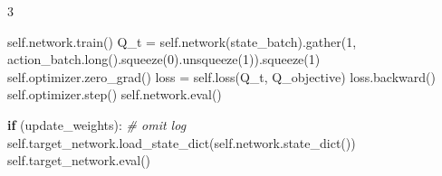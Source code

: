 \documentclass{article}
\newenvironment{Shaded}{\CodeFontSize\setlength{\topsep}{\CodeBlockSkip}\setlength{\partopsep}{0pt}}{}
\newcommand{\BuiltInTok}[1]{\textcolor[rgb]{0.00,0.50,0.00}{#1}}
\newcommand{\CommentTok}[1]{\textcolor[rgb]{0.38,0.63,0.69}{\textit{#1}}}
\newcommand{\ControlFlowTok}[1]{\textcolor[rgb]{0.00,0.44,0.13}{\textbf{#1}}}
\newcommand{\DecValTok}[1]{\textcolor[rgb]{0.25,0.63,0.44}{#1}}
\newcommand{\NormalTok}[1]{#1}
\newcommand{\OperatorTok}[1]{\textcolor[rgb]{0.40,0.40,0.40}{#1}}
\newcommand{\VariableTok}[1]{\textcolor[rgb]{0.10,0.09,0.49}{#1}}
\newcommand{\CodeFontSize}{\fontsize{4.8}{5.6}\selectfont}
\newcommand{\NumColumns}{3}  %
\newlength{\CodeBlockSkip}
\begin{document}
\begin{multicols*}{\NumColumns}
\begin{Shaded}
\begin{Highlighting}[]
  \VariableTok{self}\NormalTok{.network.train()}
\NormalTok{  Q\_t }\OperatorTok{=} \VariableTok{self}\NormalTok{.network(state\_batch).gather(}\DecValTok{1}\NormalTok{, action\_batch.}\BuiltInTok{long}\NormalTok{().squeeze(}\DecValTok{0}\NormalTok{).unsqueeze(}\DecValTok{1}\NormalTok{)).squeeze(}\DecValTok{1}\NormalTok{)}
  \VariableTok{self}\NormalTok{.optimizer.zero\_grad()}
\NormalTok{  loss }\OperatorTok{=} \VariableTok{self}\NormalTok{.loss(Q\_t, Q\_objective)}
\NormalTok{  loss.backward()}
  \VariableTok{self}\NormalTok{.optimizer.step()}
  \VariableTok{self}\NormalTok{.network.}\BuiltInTok{eval}\NormalTok{()}

  \ControlFlowTok{if}\NormalTok{ (update\_weights): }\CommentTok{\# omit log}
    \VariableTok{self}\NormalTok{.target\_network.load\_state\_dict(}\VariableTok{self}\NormalTok{.network.state\_dict())}
    \VariableTok{self}\NormalTok{.target\_network.}\BuiltInTok{eval}\NormalTok{()}
\end{Highlighting}
\end{Shaded}


\end{multicols*}
\end{document}
